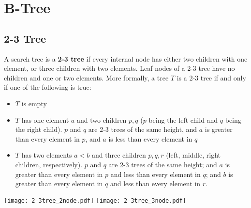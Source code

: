 \section{B-Tree}

\subsection{2-3 Tree}

\vspace{\parskip}

\begin{definition} 
    A search tree is a \textbf{2-3 tree} if every internal node has either two children with one element, or three children with two elements. Leaf nodes of a 2-3 tree have no children and one or two elements. More formally, a tree $T$  is a 2-3 tree if and only if one of the following is true:
    \begin{itemize}
        \item $T$ is empty
        \item $T$ has one element $a$ and two children $p,q$ ($p$ being the left child and $q$ being the right child). $p$ and $q$ are 2-3 trees of the same height, and $a$ is greater than every element in $p$, and $a$ is less than every element in $q$ 
        \item $T$ has two elements $a < b$ and three children $p,q,r$ (left, middle, right children, respectively). $p$ and $q$ are 2-3 trees of the same height; and $a$ is greater than every element in $p$ and less than every element in $q$; and $b$ is greater than every element in $q$ and less than every element in $r$.
    \end{itemize}
    \begin{center}
        \texttt{[image: 2-3tree\_2node.pdf]} \texttt{[image: 2-3tree\_3node.pdf]}
    \end{center}
\end{definition}